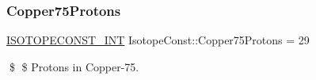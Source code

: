 \subsubsection{\texorpdfstring{Copper75\+Protons}{Copper75Protons}}
{\footnotesize\ttfamily \mbox{\hyperlink{group___isotope_const-_macros_ga5f18360b3e99483a35c32d789e62621c}{I\+S\+O\+T\+O\+P\+E\+C\+O\+N\+S\+T\+\_\+\+I\+NT}} Isotope\+Const\+::\+Copper75\+Protons = 29}

\$ \$ Protons in Copper-\/75. 